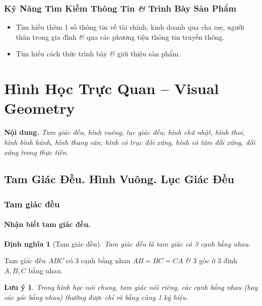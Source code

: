 \documentclass{article}
\numberwithin{equation}{section}
\newtheorem{dinhnghia}{Định nghĩa}[section]
\newtheorem{luuy}{Lưu ý}[section]
\begin{document}
\subsubsection{Kỹ Năng Tìm Kiếm Thông Tin \textit{\&} Trình Bày Sản Phẩm}

\begin{itemize}
	\item Tìm hiểu thêm 1 số thông tin về tài chính, kinh doanh qua cha mẹ, người thân trong gia đình \textit{\&} qua các phương tiện thông tin truyền thông.
	\item Tìm hiểu cách thức trình bày \textit{\&} giới thiệu sản phẩm.
\end{itemize}


\section{Hình Học Trực Quan -- Visual Geometry}
\textbf{Nội dung.} \textit{Tam giác đều, hình vuông, lục giác đều; hình chữ nhật, hình thoi, hình bình hành, hình thang cân; hình có trục đối xứng, hình có tâm đối xứng, đối xứng trong thực tiễn}.

\subsection{Tam Giác Đều. Hình Vuông. Lục Giác Đều}

\subsubsection{Tam giác đều}

\paragraph{Nhận biết tam giác đều.}
\begin{dinhnghia}[Tam giác đều]
	\emph{Tam giác đều} là tam giác có 3 cạnh bằng nhau.
\end{dinhnghia}
Tam giác đều $ABC$ có 3 cạnh bằng nhau $AB = BC = CA$ \textit{\&} 3 góc ở 3 đỉnh $A,B,C$ bằng nhau.

\begin{luuy}
	Trong hình học nói chung, tam giác nói riêng, các cạnh bằng nhau (hay các góc bằng nhau) thường được chỉ rõ bằng cùng 1 ký hiệu.
\end{luuy}
\end{document}
